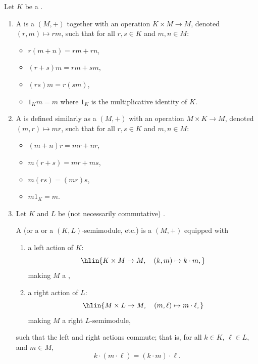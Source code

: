 \begin{definition} \label{definition:semimodule_over_a_semiring_bisemimodule_over_semirings}
Let $K$ be a .

\begin{enumerate}
    \item A  is a  $(M,+)$ together with an operation $K \times M \to M$, denoted $(r,m) \mapsto rm$, such that for all $r,s \in K$ and $m,n \in M$:
    \begin{itemize}
        \item $r(m+n) = rm + rn$,
        \item $(r+s)m = rm + sm$,
        \item $(rs)m = r(sm)$,
        \item $1_K m = m$ where $1_K$ is the multiplicative identity of $K$.
    \end{itemize}

    \item A  is defined similarly as a  $(M,+)$ with an operation $M \times K \to M$, denoted $(m,r) \mapsto mr$, such that for all $r,s \in K$ and $m,n \in M$:
    \begin{itemize}
        \item $(m+n)r = mr + nr$,
        \item $m(r+s) = mr + ms$,
        \item $m(rs) = (mr)s$,
        \item $m 1_K = m$.
    \end{itemize}

    \item Let $K$ and $L$ be (not necessarily commutative) .

    A  (or a  or a $(K,L)$-semimodule, etc.) is a  $(M,+)$ equipped with
    \begin{enumerate}
        \item a left action of $K$:
        $$\hlin{K \times M \to M, \quad (k,m) \mapsto k \cdot m,}$$
        making $M$ a ,
        \item a right action of $L$:
        $$\hlin{M \times L \to M, \quad (m,\ell) \mapsto m \cdot \ell,}$$
        making $M$ a right $L$-semimodule,
    \end{enumerate}
    such that the left and right actions commute; that is, for all $k \in K$, $\ell \in L$, and $m \in M$,
    $$ k \cdot (m \cdot \ell) = (k \cdot m) \cdot \ell.  $$


\end{enumerate}
\end{definition}
